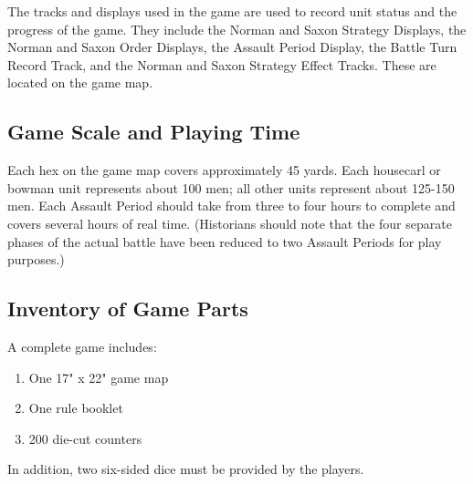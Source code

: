 The tracks and displays used in the game are used to record unit status and the progress of the game. They include the Norman and Saxon Strategy Displays, the Norman and Saxon Order Displays, the Assault Period Display, the Battle Turn Record Track, and the Norman and Saxon Strategy Effect Tracks. These are located on the game map.

\subsection{Game Scale and Playing Time}

Each hex on the game map covers approximately 45 yards. Each housecarl or bowman unit represents about 100 men; all other units represent about 125-150 men. Each Assault Period should take from three to four hours to complete and covers several hours of real time. (Historians should note that the four separate phases of the actual battle have been reduced to two Assault Periods for play purposes.)

\subsection{Inventory of Game Parts}

A complete game includes:

\begin{enumerate}[label=*]
    \item One 17" x 22" game map
    \item One rule booklet
    \item 200 die-cut counters
\end{enumerate}

In addition, two six-sided dice must be provided by the players.
